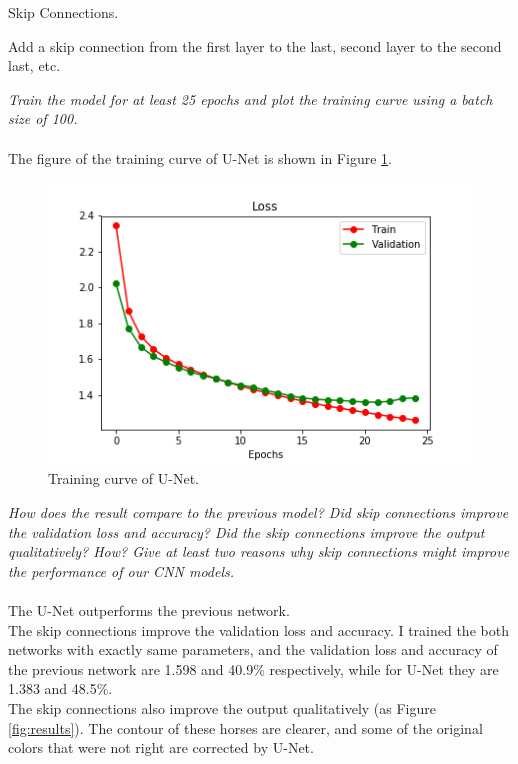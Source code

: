 \documentclass{myhw}
\begin{document}
\begin{homeworkProblem}
Skip Connections.
\begin{homeworkSection}
Add a skip connection from the first layer to the last, second layer to the second last, etc.
\end{homeworkSection}
\begin{homeworkSection}
\emph{Train the model for at least 25 epochs and plot the training curve using a batch size of 100.} \\ \\
The figure of the training curve of U-Net is shown in Figure \ref{fig:curve_unet}. 
\begin{figure}[h]
\centering
\includegraphics[width=.5\textwidth]{training_curve_unet.png}
\caption{Training curve of U-Net.}
\label{fig:curve_unet}
\end{figure}
\end{homeworkSection}
\begin{homeworkSection}
\emph{How does the result compare to the previous model? Did skip connections improve the validation loss and accuracy? Did the skip connections improve the output qualitatively? How? Give at least two reasons why skip connections might improve the performance of our CNN models.} \\ \\
The U-Net outperforms the previous network. \\
The skip connections improve the validation loss and accuracy. I trained the both networks with exactly same parameters, and the validation loss and accuracy of the previous network are 1.598 and 40.9\% respectively, while for U-Net they are 1.383 and 48.5\%. \\
The skip connections also improve the output qualitatively (as Figure \ref{fig:results}). The contour of these horses are clearer, and some of the original colors that were not right are corrected by U-Net. 
\begin{figure}[h]
  \centering
\end{figure}
\end{homeworkSection}
\end{homeworkProblem}
\end{document}

